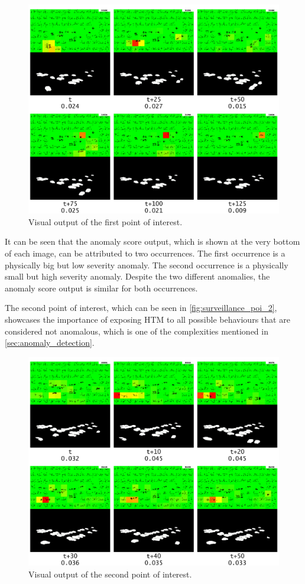 \begin{figure}[H]
    \centering
    \includegraphics[width=\textwidth]{resources/experiments/surveillance/surveillance_poi_1.png}
    \caption{Visual output of the first point of interest.}
    \label{fig:surveillance_poi_1}
\end{figure}
It can be seen that the anomaly score output, which is shown at the very bottom of each image, can be attributed to two occurrences. The first occurrence is a physically big but low severity anomaly. The second occurrence is a physically small but high severity anomaly. Despite the two different anomalies, the anomaly score output is similar for both occurrences.
\par
The second point of interest, which can be seen in \autoref{fig:surveillance_poi_2}, showcases the importance of exposing HTM to all possible behaviours that are considered not anomalous, which is one of the complexities mentioned in \autoref{sec:anomaly_detection}.
\begin{figure}[H]
    \centering
    \includegraphics[width=\textwidth]{resources/experiments/surveillance/surveillance_poi_2.png}
    \caption{Visual output of the second point of interest.}
    \label{fig:surveillance_poi_2}
\end{figure}

